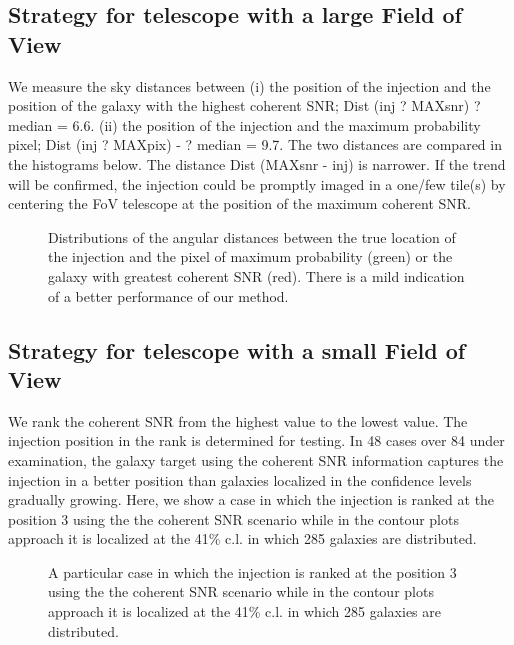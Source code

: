 \documentclass[aps, prd, twocolumn, superscriptaddress, nofootinbib]{revtex4-1}
\begin{document}
\subsection{Strategy for telescope with a large Field of View}

We measure the sky distances between
(i) the position of the injection and the position of the galaxy with the highest coherent SNR; Dist (inj ? MAXsnr) ? median = 6.6.
(ii) the position of the injection and the maximum probability pixel; Dist (inj ? MAXpix) - ? median = 9.7.
The two distances are compared in the histograms below. The distance Dist (MAXsnr - inj) is narrower. If the trend will be confirmed, the injection could be promptly imaged in a one/few tile(s) by centering the FoV telescope at the position of the maximum coherent SNR.

\begin{figure}[h]
\centering
{}
\caption{\label{fig:vacuum}Distributions of the angular distances between the true location of the injection and the pixel of maximum probability (green) or the galaxy with greatest coherent SNR (red). There is a mild indication of a better performance of our method.}
\end{figure}

\subsection{Strategy for telescope with a small Field of View}

We rank the coherent SNR from the highest value to the lowest value. The injection position in the rank is determined for testing. In 48 cases over 84 under examination, the galaxy target using the coherent SNR information captures the injection in a better position than galaxies localized in the confidence levels gradually growing. Here, we show a case in which the injection is ranked at the position 3 using the the coherent SNR scenario while in the contour plots approach it is localized at the 41\% c.l. in which 285 galaxies are distributed.

\begin{figure}[h]
\centering
{}
\caption{\label{fig:vacuum} A particular case in which the injection is ranked at the position 3 using the the coherent SNR scenario while in the contour plots approach it is localized at the 41\% c.l. in which 285 galaxies are distributed.}
\end{figure}
\end{document}
